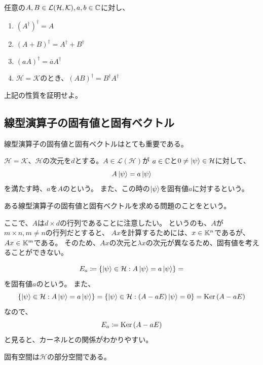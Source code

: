 \begin{Prop} 任意の$A,B\in\mathcal{L}(\mathcal{H},\mathcal{K}),a,b\in\mathbb{C}$に対し、
  \begin{enumerate}
    \item $(A^\dagger)^\dagger = A$
    \item $(A+B)^\dagger = A^\dagger + B^\dagger$
    \item $(aA)^\dagger = \overline{a}A^\dagger$
    \item $\mathcal{H} = \mathcal{K}$のとき、$(AB)^\dagger = B^\dagger A^\dagger$
  \end{enumerate}

\end{Prop}

\begin{Mondai}
  上記の性質を証明せよ。
\end{Mondai}

\subsection{線型演算子の固有値と固有ベクトル}
線型演算子の固有値と固有ベクトルはとても重要である。

\begin{Def}
  $\mathcal{H} = \mathcal{K}$、$\mathcal{H}$の次元を$d$とする。$A\in\mathcal{L}(\mathcal{H})$が
  $a\in\mathbb{C}$と$0\neq\ket{\psi}\in\mathcal{H}$に対して、
  $$
  A\ket{\psi} = a\ket{\psi}
  $$
  を満たす時、$a$を$A$のという。
  また、この時の$\ket{\psi}$を固有値$a$に対するという。
\end{Def}

ある線型演算子の固有値と固有ベクトルを求める問題のことをという。

ここで、$A$は$d \times d$の行列であることに注意したい。
というのも、$A$が$m \times n,m\neq n$の行列だとすると、
$Ax$を計算するためには、$x\in\mathbb{K}^n$であるが、$Ax\in\mathbb{K}^m$である。
そのため、$Ax$の次元と$\lambda x$の次元が異なるため、固有値を考えることができない。

\begin{Def}
  $$
    E_a \coloneqq \{ \ket{\psi} \in \mathcal{H} : A\ket{\psi} = a\ket{\psi} \} =
  $$
  を固有値$a$のという。
  また、
  $$
    \{ \ket{\psi} \in \mathcal{H} : A\ket{\psi} = a\ket{\psi} \} = \{ \ket{\psi} \in \mathcal{H} : (A-aE)\ket{\psi} = 0 \} = \text{Ker}\,(A-aE)
  $$
  なので、
  $$
    E_a \coloneqq \text{Ker}\,(A-aE)
  $$
    と見ると、カーネルとの関係がわかりやすい。
\end{Def}
固有空間は$\mathcal{H}$の部分空間である。


